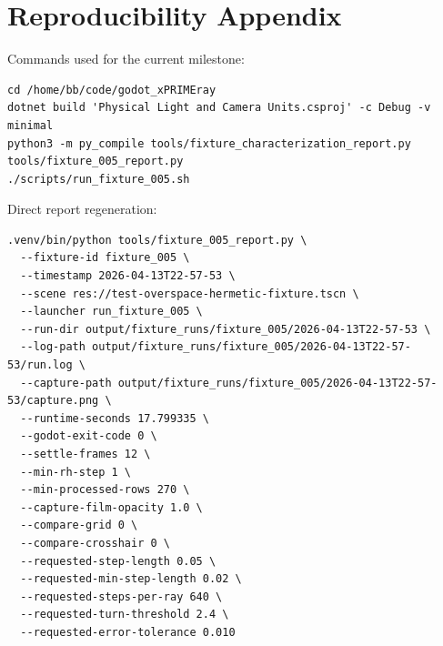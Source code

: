 \documentclass[11pt]{article}
\begin{document}
\section{Reproducibility Appendix}
Commands used for the current milestone:

\begin{verbatim}
cd /home/bb/code/godot_xPRIMEray
dotnet build 'Physical Light and Camera Units.csproj' -c Debug -v minimal
python3 -m py_compile tools/fixture_characterization_report.py tools/fixture_005_report.py
./scripts/run_fixture_005.sh
\end{verbatim}

Direct report regeneration:

\begin{verbatim}
.venv/bin/python tools/fixture_005_report.py \
  --fixture-id fixture_005 \
  --timestamp 2026-04-13T22-57-53 \
  --scene res://test-overspace-hermetic-fixture.tscn \
  --launcher run_fixture_005 \
  --run-dir output/fixture_runs/fixture_005/2026-04-13T22-57-53 \
  --log-path output/fixture_runs/fixture_005/2026-04-13T22-57-53/run.log \
  --capture-path output/fixture_runs/fixture_005/2026-04-13T22-57-53/capture.png \
  --runtime-seconds 17.799335 \
  --godot-exit-code 0 \
  --settle-frames 12 \
  --min-rh-step 1 \
  --min-processed-rows 270 \
  --capture-film-opacity 1.0 \
  --compare-grid 0 \
  --compare-crosshair 0 \
  --requested-step-length 0.05 \
  --requested-min-step-length 0.02 \
  --requested-steps-per-ray 640 \
  --requested-turn-threshold 2.4 \
  --requested-error-tolerance 0.010
\end{verbatim}
\end{document}
